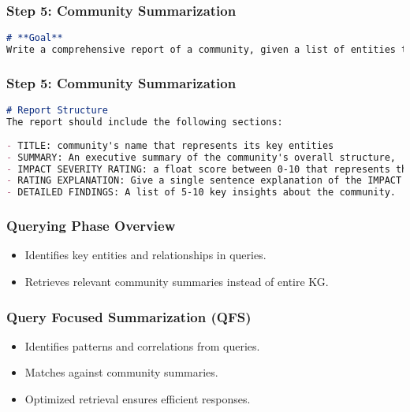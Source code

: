 \begin{frame}[fragile]\frametitle{Step 5: Community Summarization}

    \begin{lstlisting}[language=markdown]
# **Goal**
Write a comprehensive report of a community, given a list of entities that belong to the community as well as their relationships and optional associated claims. The report will be used to inform decision-makers about information associated with the community and their potential impact. The content of this report includes an overview of the community's key entities, their legal compliance, technical capabilities, reputation, and noteworthy claims.

    \end{lstlisting}	
\end{frame}

\begin{frame}[fragile]\frametitle{Step 5: Community Summarization}

    \begin{lstlisting}[language=markdown]
# Report Structure
The report should include the following sections:
 
- TITLE: community's name that represents its key entities 
- SUMMARY: An executive summary of the community's overall structure,
- IMPACT SEVERITY RATING: a float score between 0-10 that represents the severity of IMPACT posed by entities within the community. 
- RATING EXPLANATION: Give a single sentence explanation of the IMPACT severity rating.
- DETAILED FINDINGS: A list of 5-10 key insights about the community.
    \end{lstlisting}	
\end{frame}

\begin{frame}[fragile]\frametitle{Querying Phase Overview}
    \begin{itemize}
        \item Identifies key entities and relationships in queries.
        \item Retrieves relevant community summaries instead of entire KG.
    \end{itemize}
\end{frame}

\begin{frame}[fragile]\frametitle{Query Focused Summarization (QFS)}
    \begin{itemize}
        \item Identifies patterns and correlations from queries.
        \item Matches against community summaries.
        \item Optimized retrieval ensures efficient responses.
    \end{itemize}
\end{frame}

